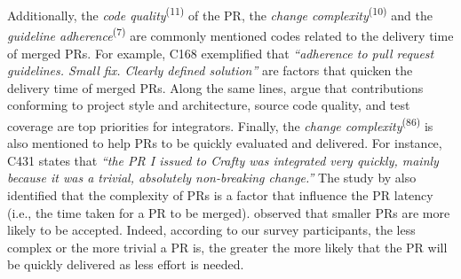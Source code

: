 Additionally, the \textit{code quality}\textsuperscript{(11)} of the PR, the \textit{change complexity}\textsuperscript{(10)} and the \textit{guideline adherence}\textsuperscript{(7)} are commonly mentioned codes related to the delivery time of merged PRs.
For example, C168 exemplified that \textit{``adherence to pull request guidelines. Small fix. Clearly defined solution''} are factors that quicken the delivery time of merged PRs. Along the same lines, \cite{gousios2015work} argue that contributions conforming to project style and architecture, source code quality, and test coverage are top priorities for integrators. Finally, the \textit{change complexity}\textsuperscript{(86)} is also mentioned to help PRs to be quickly evaluated and delivered. For instance, C431 states that \textit{``the PR I issued to Crafty was integrated very quickly, mainly because it was a trivial, absolutely non-breaking change.''} The study by \cite{Yu2016-cy} also identified that the complexity of PRs is a factor that influence the PR latency (i.e., the time taken for a PR to be merged). \cite{weissgerber2008small} observed that smaller PRs are more likely to be accepted. Indeed, according to our survey participants, the less complex or the more trivial a PR is, the greater the more likely that the PR will be quickly delivered as less effort is needed. 

